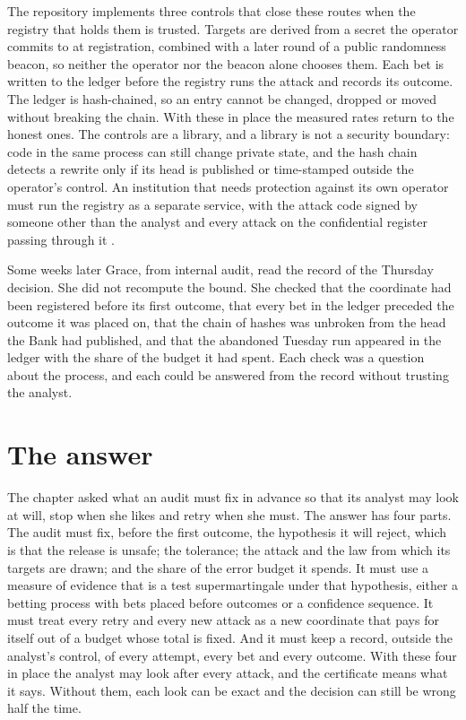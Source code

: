 The repository implements three controls that close these routes when the registry
that holds them is trusted. Targets are derived from a secret the operator commits
to at registration, combined with a later round of a public randomness beacon, so
neither the operator nor the beacon alone chooses them. Each bet is written to the
ledger before the registry runs the attack and records its outcome. The ledger is
hash-chained, so an entry cannot be changed, dropped or moved without breaking the
chain. With these in place the measured rates return to the honest ones. The
controls are a library, and a library is not a security boundary: code in the same
process can still change private state, and the hash chain detects a rewrite only
if its head is published or time-stamped outside the operator's control. An
institution that needs protection against its own operator must run the registry as
a separate service, with the attack code signed by someone other than the analyst
and every attack on the confidential register passing through it
\citep{saltzer1975}.

Some weeks later Grace, from internal audit, read the record of the Thursday
decision. She did not recompute the bound. She checked that the coordinate had been
registered before its first outcome, that every bet in the ledger preceded the
outcome it was placed on, that the chain of hashes was unbroken from the head the
Bank had published, and that the abandoned Tuesday run appeared in the ledger with
the share of the budget it had spent. Each check was a question about the process,
and each could be answered from the record without trusting the analyst.

\section{The answer}\label{c06:sec-answer}

The chapter asked what an audit must fix in advance so that its analyst may look
at will, stop when she likes and retry when she must. The answer has four parts.
The audit must fix, before the first outcome, the hypothesis it will reject, which
is that the release is unsafe; the tolerance; the attack and the law from which its
targets are drawn; and the share of the error budget it spends. It must use a
measure of evidence that is a test supermartingale under that hypothesis, either a
betting process with bets placed before outcomes or a confidence sequence. It must
treat every retry and every new attack as a new coordinate that pays for itself out
of a budget whose total is fixed. And it must keep a record, outside the analyst's
control, of every attempt, every bet and every outcome. With these four in place the
analyst may look after every attack, and the certificate means what it says. Without
them, each look can be exact and the decision can still be wrong half the time.

